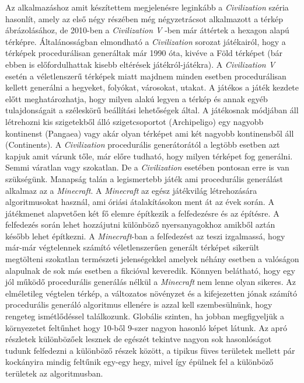 \newline Az alkalmazáshoz amit készítettem megjelenésre leginkább a \textit{Civilization} széria hasonlít, amely az első négy részében még négyzetrácsot alkalmazott a térkép ábrázolásához, de 2010-ben a \textit{Civilization V} -ben már áttértek a hexagon alapú térképre. Általánosságban elmondható a \textit{Civilization} sorozat játékairól, hogy a térképek procedurálisan generáltak már 1990 óta, kivéve a Föld térképet (bár ebben is előfordulhattak kisebb eltérések játékról-játékra). A \textit{Civilization V} esetén a véletlenszerű térképek miatt majdnem minden esetben procedurálisan kellett generálni a hegyeket, folyókat, városokat, utakat. A játékos a játék kezdete előtt meghatározhatja, hogy milyen alakú legyen a térkép és annak egyéb tulajdonságait a széleskörű beállítási lehetőségek által. A játékosnak módjában áll létrehozni kis szigetekből álló szigetcsoportot (Archipeligo) egy nagyobb kontinenst (Pangaea) vagy akár olyan térképet ami két nagyobb kontinensből áll (Continents). A \textit{Civilization} procedurális generátorától a legtöbb esetben azt kapjuk amit várunk tőle, már előre tudható, hogy milyen térképet fog generálni. Semmi váratlan vagy szokatlan. De a \textit{Civilization} esetében pontosan erre is van szükségünk.
\newline
\newline Manapság talán a legismertebb játék ami procedurális generálást alkalmaz az a \textit{Minecraft}. A \textit{Minecraft} az egész játékvilág létrehozására algoritmusokat használ, ami óriási átalakításokon ment át az évek során. A játékmenet alapvetően két fő elemre építkezik a felfedezésre és az építésre. A felfedezés során lehet hozzájutni különböző nyersanyagokhoz amikből aztán később lehet építkezni. A \textit{Minecraft}-ban a felfedezést az teszi izgalmassá, hogy már-már végtelennek számító véletlenszerűen generált térképet sikerült megtölteni szokatlan természeti jelenségekkel amelyek néhány esetben a valóságon alapulnak de sok más esetben a fikcióval keveredik. Könnyen belátható, hogy egy jól működő procedurális generálás nélkül a \textit{Minecraft} nem lenne olyan sikeres. Az elméletileg végtelen térkép, a változatos növényzet és a kifejezetten jónak számító procedurális generáló algoritmus ellenére is azzal kell szembesülnünk, hogy rengeteg ismétlődéssel találkozunk. Globális szinten, ha jobban megfigyeljük a környezetet feltűnhet hogy 10-ből 9-szer nagyon hasonló képet látunk. Az apró részletek különbözőek lesznek de egészét tekintve nagyon sok hasonlóságot tudunk felfedezni a különböző részek között, a tipikus füves területek mellett pár kockányira mindig feltűnik egy-egy hegy, mivel így épülnek fel a különböző területek az algoritmusban. 

